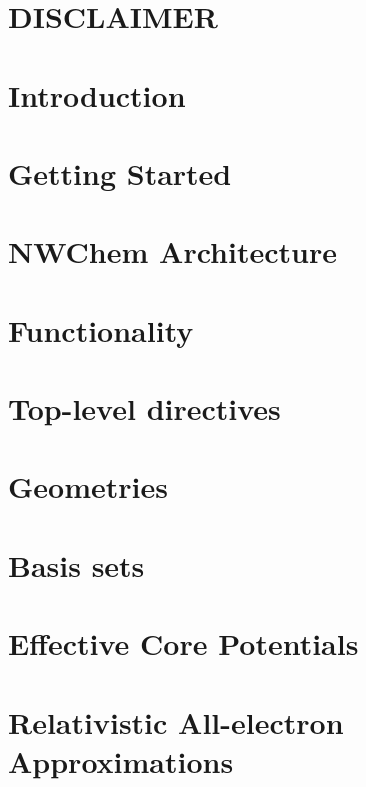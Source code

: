 \documentclass[12pt,fleqn]{book}
\begin{document}


\chapter*{\center DISCLAIMER}


\clearpage

\tableofcontents

\clearpage

\chapter{Introduction}


\chapter{Getting Started}


\chapter{NWChem Architecture}


\chapter{Functionality}


\chapter{Top-level directives}


\chapter{Geometries}


\chapter{Basis sets}


\chapter{Effective Core Potentials}


\chapter{Relativistic All-electron Approximations}

\end{document}
